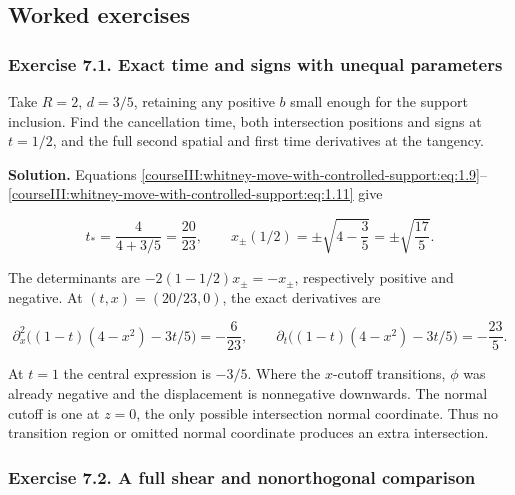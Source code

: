 \subsection{Worked exercises}
\label{courseIII:whitney-move-with-controlled-support:move-exercises}

\label{courseIII:whitney-move-with-controlled-support:section-7}

\subsubsection{Exercise 7.1. Exact time and signs with unequal parameters}
\label{courseIII:whitney-move-with-controlled-support:exercise-7.1}

\label{courseIII:whitney-support:7.1}

Take \(R=2\), \(d=3/5\), retaining any positive \(b\) small enough for the support inclusion. Find the cancellation time, both intersection positions and signs at \(t=1/2\), and the full second spatial and first time derivatives at the tangency.

\textbf{Solution.} Equations \eqref{courseIII:whitney-move-with-controlled-support:eq:1.9}--\eqref{courseIII:whitney-move-with-controlled-support:eq:1.11} give

\begin{equation}
t_*=\frac{4}{4+3/5}=\frac{20}{23},\qquad
x_\pm(1/2)=\pm\sqrt{4-\frac35}=\pm\sqrt{\frac{17}{5}}.
\label{courseIII:whitney-move-with-controlled-support:eq:7.1}
\end{equation}

The determinants are \(-2(1-1/2)x_\pm=-x_\pm\), respectively positive and negative. At \((t,x)=(20/23,0)\), the exact derivatives are

\begin{equation}
\partial_x^2\bigl((1-t)(4-x^2)-3t/5\bigr)=-\frac6{23},
\qquad
\partial_t\bigl((1-t)(4-x^2)-3t/5\bigr)=-\frac{23}{5}.
\label{courseIII:whitney-move-with-controlled-support:eq:7.2}
\end{equation}

At \(t=1\) the central expression is \(-3/5\). Where the \(x\)-cutoff transitions, \(\phi\) was already negative and the displacement is nonnegative downwards. The normal cutoff is one at \(z=0\), the only possible intersection normal coordinate. Thus no transition region or omitted normal coordinate produces an extra intersection.

\subsubsection{Exercise 7.2. A full shear and nonorthogonal comparison}
\label{courseIII:whitney-move-with-controlled-support:exercise-7.2}

